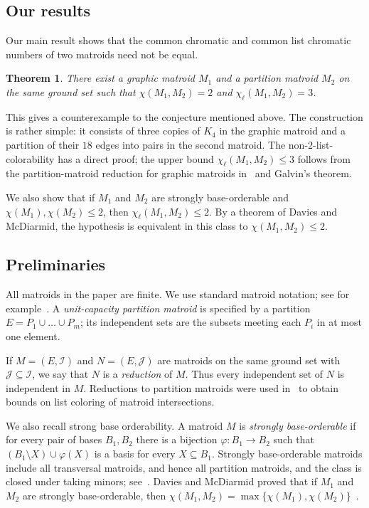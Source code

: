 \documentclass{article}
\theoremstyle{plain}
\newtheorem{thm}{Theorem}[section]
\theoremstyle{definition}
\newcommand{\cI}{\mathcal{I}}
\begin{document}
\subsection{Our results}

Our main result shows that the common chromatic and common list chromatic numbers of two matroids need not be equal.

\begin{thm}\label{thm:counterintro}
There exist a graphic matroid $M_1$ and a partition matroid $M_2$ on the same ground set such that $\chi(M_1,M_2)=2$ and $\chi_\ell(M_1,M_2)=3$.
\end{thm}

This gives a counterexample to the conjecture mentioned above. The construction is rather simple: it consists of three copies of $K_4$ in the graphic matroid and a partition of their $18$ edges into pairs in the second matroid. The non-$2$-list-colorability has a direct proof; the upper bound $\chi_\ell(M_1,M_2)\le3$ follows from the partition-matroid reduction for graphic matroids in~\cite{berczi2021list} and Galvin's theorem.

We also show that if $M_1$ and $M_2$ are strongly base-orderable and $\chi(M_1),\chi(M_2)\le2$, then $\chi_\ell(M_1,M_2)\le2$. By a theorem of Davies and McDiarmid, the hypothesis is equivalent in this class to $\chi(M_1,M_2)\le2$.

\subsection{Preliminaries}
\label{sec:preliminaries}

All matroids in the paper are finite. We use standard matroid notation; see for example~\cite{schrijver2003combinatorial}. A \textit{ unit-capacity partition matroid} is specified by a partition $E=P_1\cup\dots\cup P_m$; its independent sets are the subsets meeting each $P_i$ in at most one element.

If $M=(E,\cI)$ and $N=(E,\mathcal{J})$ are matroids on the same ground set with $\mathcal{J}\subseteq\cI$, we say that $N$ is a \textit{reduction} of $M$. Thus every independent set of $N$ is independent in $M$. Reductions to partition matroids were used in~\cite{berczi2021list} to obtain bounds on list coloring of matroid intersections.

We also recall strong base orderability. A matroid $M$ is \textit{strongly base-orderable} if for every pair of bases $B_1,B_2$ there is a bijection $\varphi\colon B_1\to B_2$ such that $(B_1\setminus X)\cup\varphi(X)$ is a basis for every $X\subseteq B_1$. Strongly base-orderable matroids include all transversal matroids, and hence all partition matroids, and the class is closed under taking minors; see~\cite[Section~42.6c]{schrijver2003combinatorial}. Davies and McDiarmid proved that if $M_1$ and $M_2$ are strongly base-orderable, then $\chi(M_1,M_2)=\max\{\chi(M_1),\chi(M_2)\}$~\cite{davies1976disjoint}.
\end{document}
